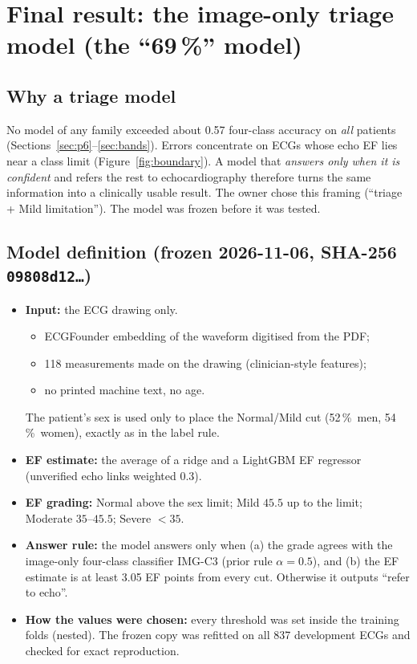 \section{Final result: the image-only triage model (the ``69\,\%'' model)}\label{sec:final}

\subsection{Why a triage model}
No model of any family exceeded about 0.57 four-class accuracy on \emph{all} patients
(Sections~\ref{sec:p6}--\ref{sec:bands}). Errors concentrate on ECGs whose echo EF lies near a class limit
(Figure~\ref{fig:boundary}). A model that \emph{answers only when it is confident} and refers the rest to
echocardiography therefore turns the same information into a clinically usable result. The owner chose this framing
(``triage + Mild limitation''). The model was frozen before it was tested.

\subsection{Model definition (frozen 2026-11-06, SHA-256 \texttt{09808d12\ldots})}
\begin{itemize}
  \item \textbf{Input:} the ECG drawing only.
  \begin{itemize}
    \item ECGFounder embedding of the waveform digitised from the PDF;
    \item 118 measurements made on the drawing (clinician-style features);
    \item no printed machine text, no age.
  \end{itemize}
  The patient's sex is used only to place the Normal/Mild cut (52\,\%\ men, 54\,\%\ women), exactly as in the label rule.
  \item \textbf{EF estimate:} the average of a ridge and a LightGBM EF regressor (unverified echo links weighted 0.3).
  \item \textbf{EF grading:} Normal above the sex limit; Mild $45.5$ up to the limit; Moderate $35$--$45.5$; Severe $<35$.
  \item \textbf{Answer rule:} the model answers only when (a) the grade agrees with the image-only four-class
    classifier IMG-C3 (prior rule $\alpha=0.5$), and (b) the EF estimate is at least 3.05 EF points from every cut.
    Otherwise it outputs ``refer to echo''.
  \item \textbf{How the values were chosen:} every threshold was set inside the training folds (nested). The frozen
    copy was refitted on all 837 development ECGs and checked for exact reproduction.
\end{itemize}

